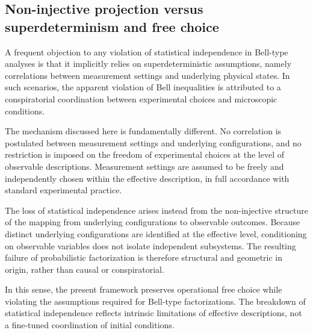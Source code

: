 \subsection{Non-injective projection versus superdeterminism and free choice}
  \label{subsec:free-choice}

  A frequent objection to any violation of statistical independence in Bell-type analyses
  is that it implicitly relies on superdeterministic assumptions, namely correlations
  between measurement settings and underlying physical states.
  In such scenarios, the apparent violation of Bell inequalities is attributed to a
  conspiratorial coordination between experimental choices and microscopic conditions.

  The mechanism discussed here is fundamentally different.
  No correlation is postulated between measurement settings and underlying
  configurations, and no restriction is imposed on the freedom of experimental choices
  at the level of observable descriptions.
  Measurement settings are assumed to be freely and independently chosen within the
  effective description, in full accordance with standard experimental practice.

  The loss of statistical independence arises instead from the non-injective structure
  of the mapping from underlying configurations to observable outcomes.
  Because distinct underlying configurations are identified at the effective level,
  conditioning on observable variables does not isolate independent subsystems.
  The resulting failure of probabilistic factorization is therefore structural and
  geometric in origin, rather than causal or conspiratorial.

  In this sense, the present framework preserves operational free choice while violating
  the assumptions required for Bell-type factorizations.
  The breakdown of statistical independence reflects intrinsic limitations of effective
  descriptions, not a fine-tuned coordination of initial conditions.
